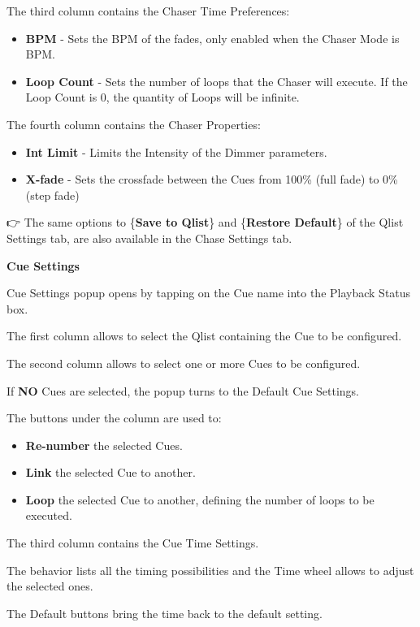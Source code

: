 \documentclass[
]{article}
\begin{document}
The third column contains the Chaser Time Preferences:

\begin{itemize}
\item
  \textbf{BPM} - Sets the BPM of the fades, only enabled when the Chaser Mode is BPM.
\item
  \textbf{Loop Count} - Sets the number of loops that the Chaser will execute. If the Loop Count is 0, the quantity of Loops will be infinite.
\end{itemize}

The fourth column contains the Chaser Properties:

\begin{itemize}
\item
  \textbf{Int Limit} - Limits the Intensity of the Dimmer parameters.
\item
  \textbf{X-fade} - Sets the crossfade between the Cues from 100\% (full fade) to 0\% (step fade)
\end{itemize}

👉 The same options to \{\textbf{Save to Qlist}\} and \{\textbf{Restore Default}\} of the Qlist Settings tab, are also available in the Chase Settings tab.

\textbf{Cue Settings}

Cue Settings popup opens by tapping on the Cue name into the Playback Status box.

The first column allows to select the Qlist containing the Cue to be configured.

The second column allows to select one or more Cues to be configured.

If \textbf{NO} Cues are selected, the popup turns to the Default Cue Settings.

The buttons under the column are used to:

\begin{itemize}
\item
  \textbf{Re-number} the selected Cues.
\item
  \textbf{Link} the selected Cue to another.
\item
  \textbf{Loop} the selected Cue to another, defining the number of loops to be executed.
\end{itemize}

The third column contains the Cue Time Settings.

The behavior lists all the timing possibilities and the Time wheel allows to adjust the selected ones.

The Default buttons bring the time back to the default setting.
\end{document}

